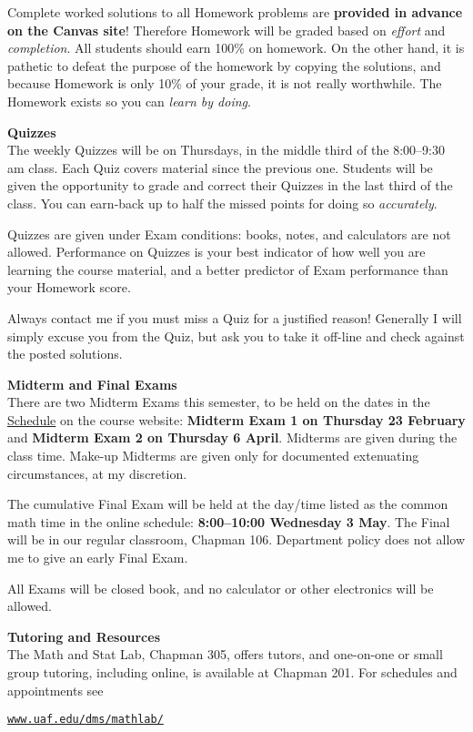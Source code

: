 \documentclass[12pt]{article}
\renewcommand{\emph}[1]{\textsf{\textbf{#1}}}
\newcommand{\localhead}[1]{\par\smallskip\textbf{#1} \smallskip\nobreak\\}%
\def\heading#1{\localhead{\large\emph{#1}}}
\begin{document}
Complete worked solutions to all Homework problems are \emph{provided in advance on the Canvas site}!  Therefore Homework will be graded based on \textsl{effort} and \textsl{completion}.  All students should earn 100\% on homework.  On the other hand, it is pathetic to defeat the purpose of the homework by copying the solutions, and because Homework is only 10\% of your grade, it is not really worthwhile.  The Homework exists so you can \textsl{learn by doing}.


\heading{Quizzes}
The weekly Quizzes will be on Thursdays, in the middle third of the 8:00--9:30 am class.  Each Quiz covers material since the previous one.  Students will be given the opportunity to grade and correct their Quizzes in the last third of the class.  You can earn-back up to half the missed points for doing so \textsl{accurately}.

Quizzes are given under Exam conditions: books, notes, and calculators are not allowed.  Performance on Quizzes is your best indicator of how well you are learning the course material, and a better predictor of Exam performance than your Homework score.

Always contact me if you must miss a Quiz for a justified reason!  Generally I will simply excuse you from the Quiz, but ask you to take it off-line and check against the posted solutions.


\heading{Midterm and Final Exams}
There are two Midterm Exams this semester, to be held on the dates in the \href{https://bueler.github.io/calc3/schedule.pdf}{Schedule} on the course website: \emph{Midterm Exam 1 on Thursday 23 February} and \emph{Midterm Exam 2 on Thursday 6 April}.  Midterms are given during the class time.  Make-up Midterms are given only for documented extenuating circumstances, at my discretion.

The cumulative Final Exam will be held at the day/time listed as the common math time in the online schedule: \emph{8:00--10:00 Wednesday 3 May}.  The Final will be in our regular classroom, Chapman 106.  Department policy does not allow me to give an early Final Exam.

All Exams will be closed book, and no calculator or other electronics will be allowed.


\heading{Tutoring and Resources}
The Math and Stat Lab, Chapman 305, offers tutors, and one-on-one or small group tutoring, including online, is available at Chapman 201.  For schedules and appointments see

\centerline{\href{http://www.uaf.edu/dms/mathlab/}{\texttt{www.uaf.edu/dms/mathlab/}}}
\end{document}
